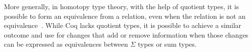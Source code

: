 More generally, in homotopy type theory, with the help of quotient types, it is possible to form an equivalence
from a relation, even when the relation is not an equivalence~\cite{angiuli2020internalizing}.
While Coq lacks quotient types,
it is possible to achieve a similar outcome and use \toolname for changes that add or remove information
when those changes can be expressed as equivalences between $\Sigma$ types or sum types.
%
%
%
%
%
%


